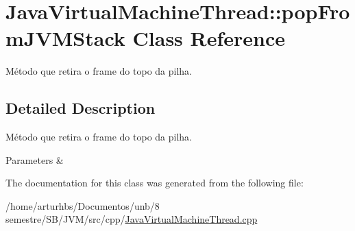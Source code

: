 \hypertarget{classJavaVirtualMachineThread_1_1popFromJVMStack}{}\section{Java\+Virtual\+Machine\+Thread\+:\+:pop\+From\+J\+V\+M\+Stack Class Reference}
\label{classJavaVirtualMachineThread_1_1popFromJVMStack}


Método que retira o frame do topo da pilha.  




\subsection{Detailed Description}
Método que retira o frame do topo da pilha. 


\begin{DoxyParams}{Parameters}
{\em } & \\
\hline
\end{DoxyParams}


The documentation for this class was generated from the following file\+:\begin{DoxyCompactItemize}
\item 
/home/arturhbs/\+Documentos/unb/8 semestre/\+S\+B/\+J\+V\+M/src/cpp/\hyperlink{JavaVirtualMachineThread_8cpp}{Java\+Virtual\+Machine\+Thread.\+cpp}\end{DoxyCompactItemize}
